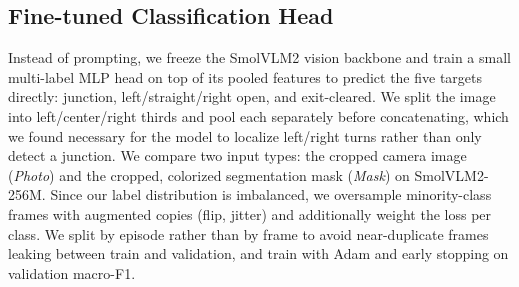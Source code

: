 \subsection{Fine-tuned Classification Head}
\label{subsec:vlm_training}

Instead of prompting, we freeze the SmolVLM2 vision backbone and train a small multi-label MLP head on top of its pooled features to predict the five targets directly: junction, left/straight/right open, and exit-cleared.
We split the image into left/center/right thirds and pool each separately before concatenating, which we found necessary for the model to localize left/right turns rather than only detect a junction.
We compare two input types: the cropped camera image (\textit{Photo}) and the cropped, colorized segmentation mask (\textit{Mask}) on SmolVLM2-256M.
Since our label distribution is imbalanced, we oversample minority-class frames with augmented copies (flip, jitter) and additionally weight the loss per class.
We split by episode rather than by frame to avoid near-duplicate frames leaking between train and validation, and train with Adam and early stopping on validation macro-F1.
